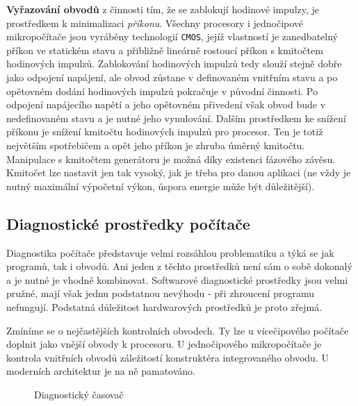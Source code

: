       \textbf{Vyřazování obvodů} z činnosti tím, že se zablokují hodinové impulzy, je prostředkem k 
      minimalizaci \emph{příkonu}. Všechny procesory i jednočipové mikropočítače jsou vyráběny 
      technologií \texttt{CMOS}, jejíž vlastností je zanedbatelný příkon ve statickém stavu a 
      přibližně lineárně rostoucí  příkon s kmitočtem hodinových impulzů. Zablokování hodinových 
      impulzů tedy slouží stejně dobře jako odpojení napájení, ale obvod zůstane v definovaném 
      vnitřním stavu a po opětovném dodání hodinových impulzů pokračuje v původní činnosti. Po 
      odpojení napájecího napětí a jeho opětovném přivedení však obvod bude v nedefinovaném stavu a 
      je nutné jeho vynulování. Dalším prostředkem ke snížení příkonu je snížení kmitočtu 
      hodinových impulzů pro procesor. Ten je totiž největším spotřebičem a opět jeho příkon 
      je zhruba úměrný kmitočtu. Manipulace s kmitočtem generátoru je možná díky existenci fázového 
      závěsu. Kmitočet lze nastavit jen tak vysoký, jak je třeba pro danou aplikaci (ne vždy je 
      nutný maximální výpočetní výkon, úspora energie může být důležitější).
      
    \subsection{Diagnostické prostředky počítače}
      Diagnostika počítače představuje velmi rozsáhlou problematiku a týká se jak programů, tak i 
      obvodů. Ani jeden z těchto prostředků není sám o sobě dokonalý a je nutné je vhodně 
      kombinovat. Softwarové diagnostické prostředky jsou velmi pružné, mají však jednu podstatnou 
      nevýhodu - při zhroucení programu nefungují. Podstatná důležitost hardwarových prostředků je 
      proto zřejmá.
      
      Zmíníme se o nejčastějších kontrolních obvodech. Ty lze u vícečipového počítače doplnit jako 
      vnější obvody k procesoru. U jednočipového mikropočítače je kontrola vnitřních obvodů 
      záležitostí konstruktéra integrovaného obvodu. U moderních architektur je na ně pamatováno.
      
      \begin{figure}[ht!]
        \centering  
        \caption{Diagnostický časovač}
        \label{MIT:fig_sbernice1819}
      \end{figure}
      
